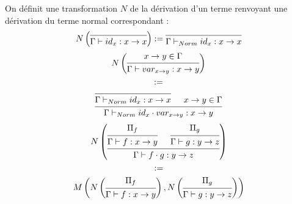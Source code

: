 \documentclass[conference]{IEEEtran}
\begin{document}
	On définit une transformation $N$ de la dérivation d'un terme renvoyant une dérivation du terme normal correspondant :
	\vspace{10pt}
	\begin{equation*}
		N \left(
		\begin{prooftree}
			\infer0[]{\Gamma \vdash id_x : x \rightarrow x}
		\end{prooftree}
		\right)
		:=
		\begin{prooftree}
			\infer0[]{\Gamma \vdash_{Norm} id_x : x \rightarrow x}
		\end{prooftree}
	\end{equation*}
	\vspace{10pt}
	\begin{equation*}
		\begin{gathered}
			N \left(
			\begin{prooftree}
				\hypo[]{x \rightarrow y \in \Gamma}
				\infer1[]{\Gamma \vdash var_{x \rightarrow y} : x \rightarrow y}
			\end{prooftree}
			\right) \\
			:= \\
			\begin{prooftree}
				\infer0[]{\Gamma \vdash_{Norm} id_x : x \rightarrow x}
				\hypo[]{x \rightarrow y \in \Gamma}
				\infer2[]{\Gamma \vdash_{Norm} id_x \cdot var_{x \rightarrow y} : x \rightarrow y}
			\end{prooftree}\\
		\end{gathered}
	\end{equation*}
	\vspace{10pt}
	\begin{equation*}
		\begin{gathered}
			N \left(
			\begin{prooftree}
				\hypo[]{\Pi_f}
				\infer1[]{\Gamma \vdash f : x \rightarrow y}
				\hypo[]{\Pi_g}
				\infer1[]{\Gamma \vdash g : y \rightarrow z}
				\infer2[]{\Gamma \vdash f \cdot g : y \rightarrow z}
			\end{prooftree}
			\right) \\
			:= \\
			M \left(
			N \left(
			\begin{prooftree}
				\hypo[]{\Pi_f}
				\infer1[]{\Gamma \vdash f : x \rightarrow y}
			\end{prooftree}
			\right),
			N \left(
			\begin{prooftree}
				\hypo[]{\Pi_g}
				\infer1[]{\Gamma \vdash g : y \rightarrow z}
			\end{prooftree}
			\right)
			\right)
		\end{gathered}
	\end{equation*}
	\vspace{10pt}
	
\end{document}
